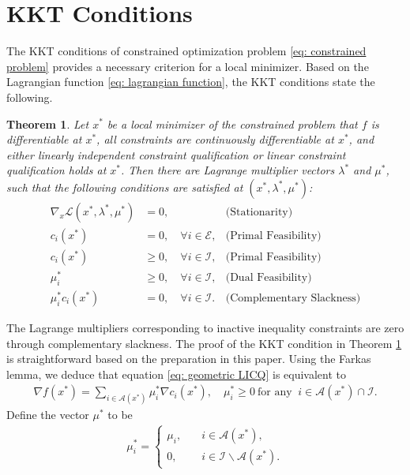 \documentclass[sn-mathphys]{JORSC-jnl}%
\theoremstyle{thmstyleone}%
\newtheorem{theorem}{Theorem}%
\theoremstyle{thmstylethree}%
\begin{document}
\section{KKT Conditions}\label{sec: KKT}

The KKT conditions of constrained optimization problem \eqref{eq: constrained problem} provides a necessary criterion for a local minimizer. Based on the Lagrangian function \eqref{eq: lagrangian function}, the KKT conditions state the following.
\begin{theorem}
\label{thm: KKT}
    Let $x^\ast$ be a local minimizer of the constrained problem that $f $ is differentiable at $x^\ast$, all constraints are continuously differentiable at $x^\ast$, and either linearly independent constraint qualification or linear constraint qualification holds at $x^\ast$. Then there are Lagrange multiplier vectors $\lambda^\ast$ and $\mu^\ast$, such that the following conditions are satisfied at $(x^\ast, \lambda^\ast, \mu^\ast)$:
\begin{align*}
    \nabla_x \mathcal{L}(x^\ast, \lambda^\ast, \mu^\ast) &= 0, & \text{(Stationarity)}\\
    c_i(x^\ast) &= 0,\quad \forall i \in \mathcal{E}, & \text{(Primal Feasibility)}\\
    c_i(x^\ast) &\geqslant 0,\quad \forall i \in \mathcal{I}, & \text{(Primal Feasibility)}\\
    \mu_i^\ast &\geqslant 0, \quad \forall i \in \mathcal{I}, & \text{(Dual Feasibility)}\\
    \mu_i^\ast c_i(x^\ast) &= 0, \quad \forall i \in \mathcal{I}. & \text{(Complementary Slackness)}
\end{align*}
\end{theorem}
The Lagrange multipliers corresponding to inactive inequality constraints are zero through complementary slackness. The proof of the KKT condition in Theorem \ref{thm: KKT} is straightforward based on the preparation in this paper. Using the Farkas lemma, we deduce that equation \eqref{eq: geometric LICQ} is equivalent to
\begin{align}
    \nabla f(x^\ast) = \sum_{i\in\mathcal{A}(x^\ast)}\mu_i^\ast\nabla c_i(x^\ast),\quad \mu_i^\ast\geqslant 0 \ \text{for any }\ i \in \mathcal{A}(x^\ast)\cap\mathcal{I}.
    \label{eq: kkt grad1}
\end{align}
Define the vector $\mu^\ast$ to be
\begin{align*}
    \mu_i^\ast = \begin{cases}
        \mu_i,\quad&i \in \mathcal{A}(x^\ast),\\
        0,\quad & i \in \mathcal{I}\backslash\mathcal{A}(x^\ast).
    \end{cases}
\end{align*}
\end{document}
